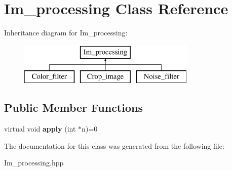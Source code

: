 \hypertarget{class_im__processing}{\section{Im\+\_\+processing Class Reference}
\label{class_im__processing}
}
Inheritance diagram for Im\+\_\+processing\+:\begin{figure}[H]
\begin{center}
\leavevmode
\includegraphics[height=2.000000cm]{class_im__processing}
\end{center}
\end{figure}
\subsection*{Public Member Functions}
\begin{DoxyCompactItemize}
\item 
\hypertarget{class_im__processing_a7219f34f46e683ef214fbc26a0cc3311}{virtual void {\bfseries apply} (int $\ast$n)=0}\label{class_im__processing_a7219f34f46e683ef214fbc26a0cc3311}

\end{DoxyCompactItemize}


The documentation for this class was generated from the following file\+:\begin{DoxyCompactItemize}
\item 
Im\+\_\+processing.\+hpp\end{DoxyCompactItemize}
